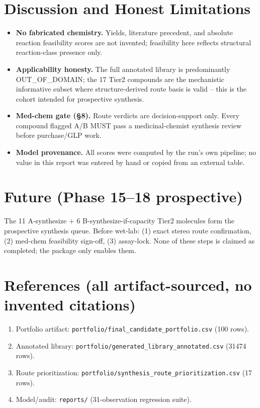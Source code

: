 \documentclass[11pt]{article}
\begin{document}
\section{Discussion and Honest Limitations}
\begin{itemize}
\item \textbf{No fabricated chemistry.} Yields, literature precedent, and
absolute reaction feasibility scores are not invented; feasibility here
reflects structural reaction-class presence only.
\item \textbf{Applicability honesty.} The full annotated library is
predominantly OUT\_OF\_DOMAIN; the 17 Tier2 compounds are the
mechanistic informative subset where structure-derived route basis is
valid \--- this is the cohort intended for prospective synthesis.
\item \textbf{Med-chem gate (\S8).} Route verdicts are decision-support
only. Every compound flagged A/B MUST pass a medicinal-chemist
synthesis review before purchase/GLP work.
\item \textbf{Model provenance.} All scores were computed by the run's
own pipeline; no value in this report was entered by hand or copied from
an external table.
\end{itemize}

\section{Future (Phase 15--18 prospective)}
The 11 A-synthesize + 6 B-synthesize-if-capacity Tier2 molecules form
the prospective synthesis queue. Before wet-lab: (1) exact stereo route
confirmation, (2) med-chem feasibility sign-off, (3) assay-lock. None of
these steps is claimed as completed; the package only enables them.

\section*{References (all artifact-sourced, no invented citations)}
\begin{enumerate}\small
\item Portfolio artifact: \texttt{portfolio/final\_candidate\_portfolio.csv} (100 rows).
\item Annotated library: \texttt{portfolio/generated\_library\_annotated.csv} (31474 rows).
\item Route prioritization: \texttt{portfolio/synthesis\_route\_prioritization.csv} (17 rows).
\item Model/audit: \texttt{reports/} (31-observation regression suite).
\end{enumerate}
\end{document}
